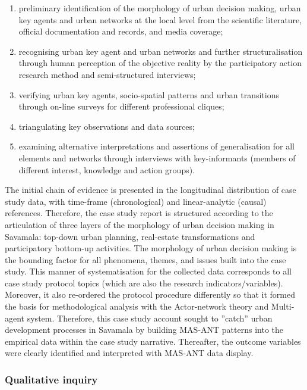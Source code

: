 \documentclass[11pt]{report}
\begin{document}
{{{{\begin{enumerate}
\item preliminary identification of the morphology of urban decision making, urban key agents and urban networks at the local level from the scientific literature, official documentation and records, and media coverage;
\item recognising urban key agent and urban networks and further structuralisation through human perception of the objective reality by the participatory action research method and semi-structured interviews;
\item verifying urban key agents, socio-spatial patterns and urban transitions through on-line surveys for different professional cliques;
\item triangulating key observations and data sources;
\item examining alternative interpretations and assertions of generalisation for all elements and networks through interviews with key-informants (members of different interest, knowledge and action groups).
\end{enumerate}

The initial chain of evidence is presented in the longitudinal distribution of case study data, with time-frame (chronological) and linear-analytic (causal) references. Therefore, the case study report is structured according to the articulation of three layers of the morphology of urban decision making in Savamala: top-down urban planning, real-estate transformations and participatory bottom-up activities. The morphology of urban decision making is the bounding factor for all phenomena, themes, and issues built into the case study.  This manner of systematisation for the collected data corresponds to all case study protocol topics (which are also the research indicators/variables). Moreover, it also re-ordered the protocol procedure differently so that it formed the basis for methodological analysis with the Actor-network theory and Multi-agent system. Therefore, this case study account sought to ”catch” urban development processes in Savamala by building MAS-ANT patterns into the empirical data within the case study narrative. Thereafter, the outcome variables were clearly identified and interpreted with MAS-ANT data display. 

\subsubsection{Qualitative inquiry}

}}}}
\end{document}
